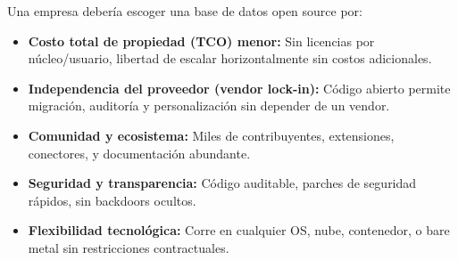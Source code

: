 \item
Una empresa debería escoger una base de datos open source por:

\begin{itemize}
	\item \textbf{Costo total de propiedad (TCO) menor:} Sin licencias por núcleo/usuario, libertad de escalar horizontalmente sin costos adicionales.
	\item \textbf{Independencia del proveedor (vendor lock-in):} Código abierto permite migración, auditoría y personalización sin depender de un vendor.
	\item \textbf{Comunidad y ecosistema:} Miles de contribuyentes, extensiones, conectores, y documentación abundante.
	\item \textbf{Seguridad y transparencia:} Código auditable, parches de seguridad rápidos, sin backdoors ocultos.
	\item \textbf{Flexibilidad tecnológica:} Corre en cualquier OS, nube, contenedor, o bare metal sin restricciones contractuales.
\end{itemize}
